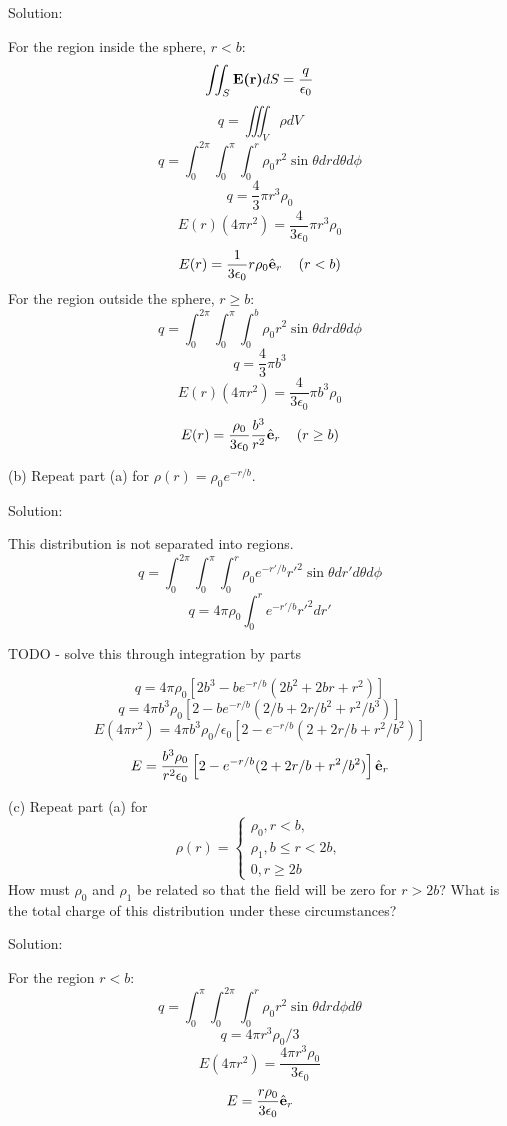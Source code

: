 \documentclass{article}
\begin{document}
\begin{enumerate}
    Solution:

    For the region inside the sphere, $r < b$:
    \[ \iint_S \textbf{E(r)} dS = \frac{q}{\epsilon_0} \]
    \[ q = \iiint_V \rho dV \]
    \[ q = \int_0^{2 \pi} \int_0^{\pi} \int_0^r \rho_0 r^2 \sin{\theta} dr d\theta d\phi \]
    \[ q = \frac{4}{3}\pi r^3 \rho_0 \]
    \[ E(r) (4 \pi r^2) = \frac{4}{3 \epsilon_0}\pi r^3 \rho_0 \]
    \[ E(r) = \frac{1}{3 \epsilon_0}r \rho_0 \hat{\textbf{e}}_r \quad \left(r<b\right)\]
    For the region outside the sphere, $r \geq b$:
    \[ q = \int_0^{2 \pi} \int_0^{\pi} \int_0^b \rho_0 r^2 \sin{\theta} dr d\theta d\phi \]
    \[ q = \frac{4}{3} \pi b^3 \]
    \[ E(r) (4 \pi r^2) = \frac{4}{3 \epsilon_0}\pi b^3 \rho_0 \]
    \[ E(r) = \frac{\rho_0}{3 \epsilon_0} \frac{b^3}{r^2} \hat{\textbf{e}}_r \quad \left(r \geq b\right)\]

    (b) Repeat part (a) for $\rho(r) = \rho_0 e^{-r/b}$.

    Solution:

    This distribution is not separated into regions.
    \[ q = \int_0^{2\pi} \int_0^\pi \int_0^r \rho_0 e^{-r'/b} r'^2 \sin{\theta} dr' d\theta d\phi \]
    \[ q = 4\pi \rho_0 \int_0^r e^{-r'/b} r'^2 dr' \]
    \centerline{TODO - solve this through integration by parts}
    \[ q = 4\pi \rho_0 \left[ 2b^3 - be^{-r/b}(2b^2 + 2br + r^2) \right] \]
    \[ q = 4\pi b^3 \rho_0 \left[ 2 - be^{-r/b}(2/b + 2r/b^2 + r^2/b^3) \right] \]
    \[ E (4 \pi r^2) = 4\pi b^3 \rho_0 /\epsilon_0 \left[ 2 - e^{-r/b}(2 + 2r/b + r^2/b^2) \right] \]
    \[ E = \frac{b^3 \rho_0}{r^2 \epsilon_0} \left[ 2 - e^{-r/b}(2 + 2r/b + r^2/b^2) \right] \hat{\textbf{e}}_r \]

    (c) Repeat part (a) for
    \begin{equation*}
        \rho(r) =
        \begin{cases}
            \rho_0, r < b, \\
            \rho_1, b \leq r < 2b, \\
            0, r \geq 2b
        \end{cases}
    \end{equation*}
    How must $\rho_0$ and $\rho_1$ be related so that the field will be zero for $r > 2b$?
    What is the total charge of this distribution under these circumstances?

    Solution:

    For the region $r < b$:
    \[ q = \int_0^{\pi} \int_0^{2\pi} \int_0^r \rho_0 r^2 \sin{\theta} dr d\phi d\theta \]
    \[ q = 4\pi r^3 \rho_0 / 3 \]
    \[ E (4 \pi r^2) = \frac{4\pi r^3 \rho_0}{3\epsilon_0} \]
    \[ E = \frac{r \rho_0}{3 \epsilon_0} \hat{\textbf{e}}_r \]


\end{enumerate}
\end{document}

